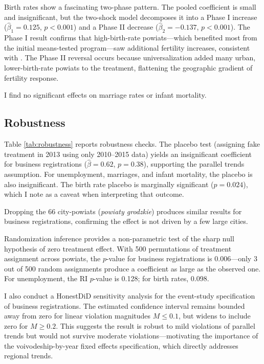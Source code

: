 \documentclass[12pt]{article}
\begin{document}
Birth rates show a fascinating two-phase pattern. The pooled coefficient is small and insignificant, but the two-shock model decomposes it into a Phase I increase ($\hat{\beta}_1 = 0.125$, $p < 0.001$) and a Phase II decrease ($\hat{\beta}_2 = -0.137$, $p < 0.001$). The Phase I result confirms that high-birth-rate powiats---which benefited most from the initial means-tested program---saw additional fertility increases, consistent with \citet{gromadzki2024fertility}. The Phase II reversal occurs because universalization added many urban, lower-birth-rate powiats to the treatment, flattening the geographic gradient of fertility response.

I find no significant effects on marriage rates or infant mortality.

\subsection{Robustness}



Table \ref{tab:robustness} reports robustness checks. The placebo test (assigning fake treatment in 2013 using only 2010--2015 data) yields an insignificant coefficient for business registrations ($\hat{\beta} = 0.62$, $p = 0.38$), supporting the parallel trends assumption. For unemployment, marriages, and infant mortality, the placebo is also insignificant. The birth rate placebo is marginally significant ($p = 0.024$), which I note as a caveat when interpreting that outcome.

Dropping the 66 city-powiats (\emph{powiaty grodzkie}) produces similar results for business registrations, confirming the effect is not driven by a few large cities.

Randomization inference provides a non-parametric test of the sharp null hypothesis of zero treatment effect. With 500 permutations of treatment assignment across powiats, the $p$-value for business registrations is 0.006---only 3 out of 500 random assignments produce a coefficient as large as the observed one. For unemployment, the RI $p$-value is 0.128; for birth rates, 0.098.

I also conduct a HonestDiD sensitivity analysis \citep{rambachan2023more} for the event-study specification of business registrations. The estimated confidence interval remains bounded away from zero for linear violation magnitudes $M \leq 0.1$, but widens to include zero for $M \geq 0.2$. This suggests the result is robust to mild violations of parallel trends but would not survive moderate violations---motivating the importance of the voivodeship-by-year fixed effects specification, which directly addresses regional trends.
\end{document}

